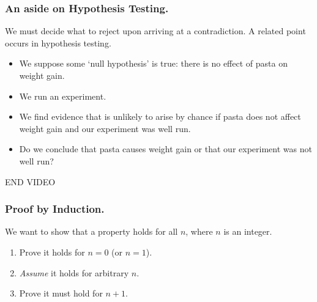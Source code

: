 \documentclass[aspectratio=169]{beamer}
\numberwithin{equation}{section}
\begin{document}
\begin{frame}
\frametitle{An aside on Hypothesis Testing.}
We must decide what to reject upon arriving at a contradiction.   A related point occurs in hypothesis testing.

\begin{itemize}
\item We suppose some `null hypothesis' is true: there is no effect of pasta on weight gain.
\item We run an experiment.\pause
\item We find evidence that is unlikely to arise by chance if pasta does not affect weight gain and our experiment was well run.\pause
\item Do we conclude that pasta causes weight gain or that our experiment was not well run? 
\end{itemize}


\end{frame}




\begin{frame}

END VIDEO

\end{frame}

\begin{frame}
\frametitle{Proof by Induction.}
We want to show that a property holds for all $n$, where $n$ is an integer. 
\begin{enumerate}
\item Prove it holds for $n=0$ (or $n=1$).  
\item  \textit{Assume} it holds for arbitrary $n$. 
\item  Prove it must hold for $n+1$.
\end{enumerate}

\end{frame}
\end{document}
